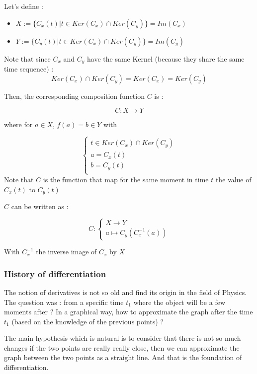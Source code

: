\documentclass[12pt]{article}
\begin{document}
Let's define :
\begin{itemize}
    \item[] $X := \{{ C_x(t) | t \in Ker(C_x) \cap Ker(C_y) \}} = Im(C_x)$
    \item[] $Y := \{{ C_y(t) | t \in Ker(C_x) \cap Ker(C_y) \}} = Im(C_y)$
\end{itemize}

Note that since $C_x$ and $C_y$ have the same Kernel (because they share the same time sequence) :
$$
Ker(C_x) \cap Ker(C_y) = Ker(C_x) = Ker(C_y)
$$

Then, the corresponding composition function $C$ is :

$$
C: X \rightarrow Y
$$

where for $a \in X$, $f(a)=b \in Y$ with 

$$
\begin{cases}
t \in Ker(C_x) \cap Ker(C_y) \\
a = C_x(t) \\
b = C_y(t) \\
\end{cases}
$$
Note that $C$ is the function that map for the same moment in time $t$ the value of $C_x(t)$ to $C_y(t)$

\bigskip

$C$ can be written as :

$$
C:
\begin{cases}
X \rightarrow Y \\
a \mapsto C_y(C_x^{-1}(a))
\end{cases}
$$

With $C_x^{-1}$ the inverse image of $C_x$ by $X$

\begin{figure}[H]
 \centering
 
\end{figure}


\subsubsection{History of differentiation}

The notion of derivatives is not so old and find its origin in the field of Physics.
The question was : from a specific time $t_1$ where the object will be a few moments after ? In a graphical way, how to approximate the graph after the time $t_1$ (based on the knowledge of the previous points) ?

The main hypothesis which is natural is to consider that there is not so much changes if the two points are really really close, then we can approximate the graph between the two points as a straight line. And that is the foundation of differentiation.
\end{document}
